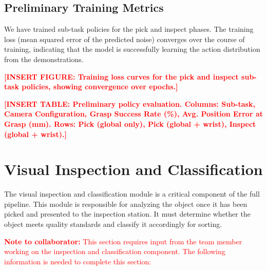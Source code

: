 \documentclass[conference]{IEEEtran}
\newcommand{\placeholder}[1]{\textcolor{red}{\textbf{[#1]}}}
\begin{document}
\subsection{Preliminary Training Metrics}

We have trained sub-task policies for the pick and inspect phases. The training loss (mean squared error of the predicted noise) converges over the course of training, indicating that the model is successfully learning the action distribution from the demonstrations.

\placeholder{INSERT FIGURE: Training loss curves for the pick and inspect sub-task policies, showing convergence over epochs.}

\placeholder{INSERT TABLE: Preliminary policy evaluation. Columns: Sub-task, Camera Configuration, Grasp Success Rate (\%), Avg. Position Error at Grasp (mm). Rows: Pick (global only), Pick (global + wrist), Inspect (global + wrist).}

\section{Visual Inspection and Classification}
\label{sec:inspection}

The visual inspection and classification module is a critical component of the full pipeline. This module is responsible for analyzing the object once it has been picked and presented to the inspection station. It must determine whether the object meets quality standards and classify it accordingly for sorting.

\textcolor{red}{\textbf{Note to collaborator:} This section requires input from the team member working on the inspection and classification component. The following information is needed to complete this section:}
\end{document}

